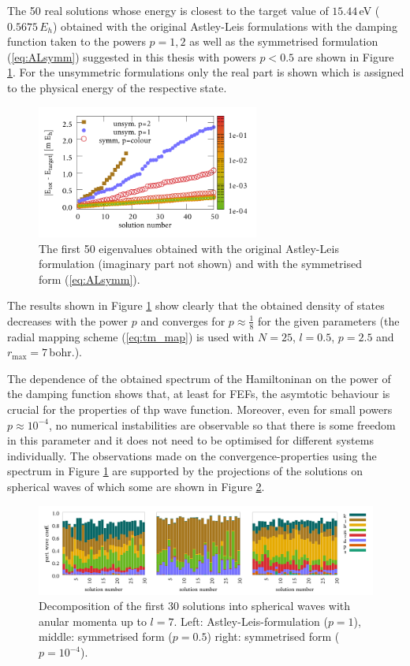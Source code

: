 The 50 real solutions whose energy is closest to the target value of $15.44\,$eV ($0.5675\,E_h$) obtained with the original Astley-Leis formulations with the damping function taken to the powers $p=1,2$ as well as the symmetrised formulation (\ref{eq:ALsymm}) suggested in this thesis with powers $p<0.5$ are shown in Figure \ref{fig:IFEMform_spect}.
For the unsymmetric formulations only the real part is shown which is assigned to the physical energy of the respective state.
\begin{figure}
\includegraphics[width=0.65\textwidth]{Figures/IFem_form_spectra}
\caption{The first 50 eigenvalues obtained with the original Astley-Leis formulation (imaginary part not shown) and with the symmetrised form (\ref{eq:ALsymm}).}
\label{fig:IFEMform_spect}
\end{figure}
The results shown in Figure \ref{fig:IFEMform_spect} show clearly that the obtained density of states decreases with the power $p$ and converges for $p\approx \frac 18$ for the given parameters (the radial mapping scheme (\ref{eq:tm_map}) is used with $N=25$, $l=0.5$, $p=2.5$ and $r_\text{max}=7\,$bohr.).

The dependence of the obtained spectrum of the Hamiltoninan on the power of the damping function shows that, at least for FEFs, the asymtotic behaviour is crucial for the properties of thp wave function. 
Moreover, even for small powers $p\approx 10^{-4}$, no numerical instabilities are observable so that there is some freedom in this parameter and it does not need to be optimised for different systems individually.
The observations made on the convergence-properties using the spectrum in Figure \ref{fig:IFEMform_spect} are supported by the projections of the solutions on spherical waves of which some are shown in Figure \ref{fig:IFEMform_project}.
\begin{figure}
\includegraphics[width=\textwidth]{Figures/Ifem_forms}
\caption{Decomposition of the first 30 solutions into spherical waves with anular momenta up to $l=7$.
Left: Astley-Leis-formulation ($p=1$), middle: symmetrised form ($p=0.5$) right: symmetrised form ($p=10^{-4}$).}
\label{fig:IFEMform_project}
\end{figure}

